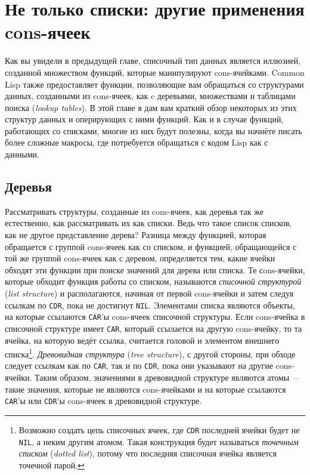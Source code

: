 \chapter{Не только списки: другие применения cons-ячеек}
\label{ch:13}

Как вы увидели в предыдущей главе, списочный тип данных является иллюзией, созданной
множеством функций, которые манипулируют cons-ячейками. Common Lisp также предоставляет
функции, позволяющие вам обращаться со структурами данных, созданными из cons-ячеек, как c
деревьями, множествами и таблицами поиска (\textit{lookup tables}). В этой главе я дам
вам краткий обзор некоторых из этих структур данных и оперирующих с ними функций. Как и в
случае функций, работающих со списками, многие из них будут полезны, когда вы начнёте
писать более сложные макросы, где потребуется обращаться с кодом Lisp как с данными.


\section{Деревья}

Рассматривать структуры, созданные из cons-ячеек, как деревья так же естественно, как
рассматривать их как списки. Ведь что такое список списков, как не другое представление
дерева?  Разница между функцией, которая обращается с группой cons-ячеек как со списком, и
функцией, обращающейся с той же группой cons-ячеек как с деревом, определяется тем, какие
ячейки обходят эти функции при поиске значений для дерева или списка. Те сons-ячейки,
которые обходит функция работы со списком, называются \textit{списочной структурой}
(\textit{list structure}) и
располагаются, начиная от первой cons-ячейки и затем следуя ссылкам по \lstinline{CDR}, пока не
достигнут \lstinline{NIL}.  Элементами списка являются объекты, на которые ссылаются
\lstinline{CAR}'ы cons-ячеек списочной структуры. Если cons-ячейка в списочной структуре имеет
\lstinline{CAR}, который ссылается на другую cons-ячейку, то та ячейка, на которую ведёт
ссылка, считается головой и элементом внешнего списка\footnote{Возможно создать цепь
  списочных ячеек, где \lstinline{CDR} последней ячейки будет не \lstinline{NIL}, а неким другим
  атомом. Такая конструкция будет называться \textit{точечным списком} (\textit{dotted
    list}), потому что последняя списочная ячейка является точечной парой.}.
\textit{Древовидная структура} (\textit{tree structure}), с другой стороны, при обходе следует
ссылкам как по \lstinline{CAR}, так и по \lstinline{CDR}, пока они указывают на другие cons-ячейки. Таким
образом, значениями в древовидной структуре являются атомы~-- такие значения, которые не
являются cons-ячейками и на которые ссылаются \lstinline{CAR}'ы или \lstinline{CDR}'ы cons-ячеек в
древовидной структуре.

